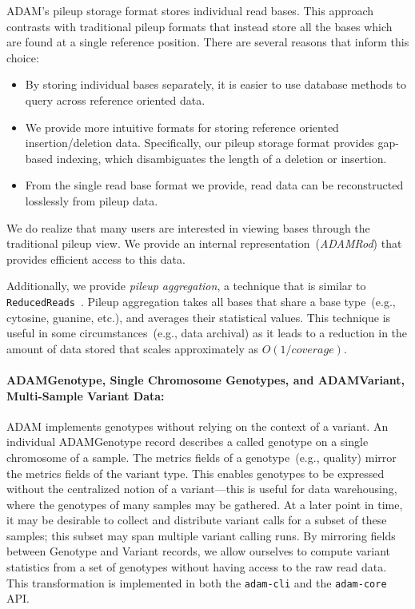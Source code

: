 \documentclass{bioinfo}
\begin{document}
ADAM's pileup storage format stores individual read bases. This approach contrasts with traditional pileup formats that instead store all the bases which are found at a single
reference position. There are several reasons that inform this choice:

\begin{itemize}
\item By storing individual bases separately, it is easier to use database methods to query across reference oriented data.
\item We provide more intuitive formats for storing reference oriented insertion/deletion data. Specifically, our pileup storage format provides gap-based indexing, which
disambiguates the length of a deletion or insertion.
\item From the single read base format we provide, read data can be reconstructed losslessly from pileup data.
\end{itemize}

We do realize that many users are interested in viewing bases through the traditional pileup view. We provide an internal representation~(\textit{ADAMRod}) that provides
efficient access to this data.

Additionally, we provide \emph{pileup aggregation}, a technique that is similar to \texttt{ReducedReads}~\citep[see][]{mckenna10}. Pileup aggregation takes all bases that
share a base type~(e.g., cytosine, guanine, etc.), and averages their statistical values. This technique is useful in some circumstances~(e.g., data archival) as it leads to a
reduction in the amount of data stored that scales approximately as $O(1/coverage)$.

\paragraph{ADAMGenotype, Single Chromosome Genotypes, and ADAMVariant, Multi-Sample Variant Data:}
\label{sec:adamvariant}

ADAM implements genotypes without relying on the context of a variant. An individual ADAMGenotype record describes a called genotype on a single chromosome of a
sample. The metrics fields of a genotype~(e.g., quality) mirror the metrics fields of the variant type. This enables genotypes to be expressed without the centralized notion
of a variant---this is useful for data warehousing, where the genotypes of many samples may be gathered. At a later point in time, it may be desirable to collect and distribute
variant calls for a subset of these samples; this subset may span multiple variant calling runs. By mirroring fields between Genotype and Variant records, we allow ourselves
to compute variant statistics from a set of genotypes without having access to the raw read data. This transformation is implemented in both the \texttt{adam-cli} and the
\texttt{adam-core} API.
\end{document}
